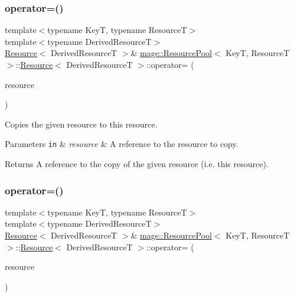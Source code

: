 \subsubsection{\texorpdfstring{operator=()}{operator=()}\hspace{0.1cm}{\footnotesize\ttfamily [1/2]}}
{\footnotesize\ttfamily template$<$typename KeyT, typename ResourceT$>$ \\
template$<$typename Derived\+ResourceT$>$ \\
\hyperlink{structmage_1_1_resource_pool_1_1_resource}{Resource}$<$ Derived\+ResourceT $>$\& \hyperlink{classmage_1_1_resource_pool}{mage\+::\+Resource\+Pool}$<$ KeyT, ResourceT $>$\+::\hyperlink{structmage_1_1_resource_pool_1_1_resource}{Resource}$<$ Derived\+ResourceT $>$\+::operator= (\begin{DoxyParamCaption}\item[{const \hyperlink{structmage_1_1_resource_pool_1_1_resource}{Resource}$<$ Derived\+ResourceT $>$ \&}]{resource }\end{DoxyParamCaption})\hspace{0.3cm}{\ttfamily [delete]}}

Copies the given resource to this resource.


\begin{DoxyParams}[1]{Parameters}
\mbox{\tt in}  & {\em resource} & A reference to the resource to copy. \\
\hline
\end{DoxyParams}
\begin{DoxyReturn}{Returns}
A reference to the copy of the given resource (i.\+e. this resource). 
\end{DoxyReturn}
\hypertarget{structmage_1_1_resource_pool_1_1_resource_a7c280a7e0fd29d7a1fc2f5f0cf51737b}{}\label{structmage_1_1_resource_pool_1_1_resource_a7c280a7e0fd29d7a1fc2f5f0cf51737b} 
\subsubsection{\texorpdfstring{operator=()}{operator=()}\hspace{0.1cm}{\footnotesize\ttfamily [2/2]}}
{\footnotesize\ttfamily template$<$typename KeyT, typename ResourceT$>$ \\
template$<$typename Derived\+ResourceT$>$ \\
\hyperlink{structmage_1_1_resource_pool_1_1_resource}{Resource}$<$ Derived\+ResourceT $>$\& \hyperlink{classmage_1_1_resource_pool}{mage\+::\+Resource\+Pool}$<$ KeyT, ResourceT $>$\+::\hyperlink{structmage_1_1_resource_pool_1_1_resource}{Resource}$<$ Derived\+ResourceT $>$\+::operator= (\begin{DoxyParamCaption}\item[{\hyperlink{structmage_1_1_resource_pool_1_1_resource}{Resource}$<$ Derived\+ResourceT $>$ \&\&}]{resource }\end{DoxyParamCaption})\hspace{0.3cm}{\ttfamily [delete]}}

